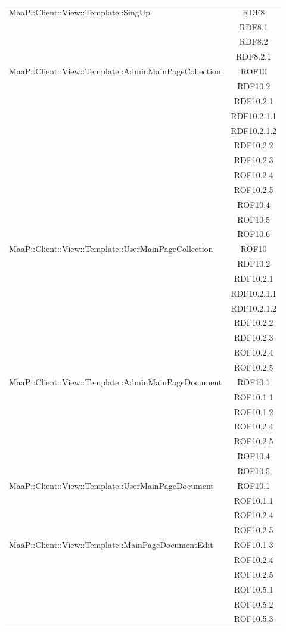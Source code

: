 \begin{center}
\begin{longtable}{|p{0.8\linewidth}|c|}
\midrule
MaaP::Client::View::Template::SingUp
& RDF8\\
& RDF8.1\\
& RDF8.2\\
& RDF8.2.1\\

\midrule
MaaP::Client::View::Template::AdminMainPageCollection
& ROF10\\
& RDF10.2\\
& RDF10.2.1\\
& RDF10.2.1.1\\
& RDF10.2.1.2\\
& RDF10.2.2\\
& RDF10.2.3\\
& ROF10.2.4\\
& ROF10.2.5\\
& ROF10.4\\
& ROF10.5\\
& ROF10.6\\


\midrule
MaaP::Client::View::Template::UserMainPageCollection
& ROF10\\
& RDF10.2\\
& RDF10.2.1\\
& RDF10.2.1.1\\
& RDF10.2.1.2\\
& RDF10.2.2\\
& RDF10.2.3\\
& ROF10.2.4\\
& ROF10.2.5\\

\midrule
MaaP::Client::View::Template::AdminMainPageDocument
& ROF10.1\\
& ROF10.1.1\\
& ROF10.1.2\\
& ROF10.2.4\\
& ROF10.2.5\\
& ROF10.4\\
& ROF10.5\\


\midrule
MaaP::Client::View::Template::UserMainPageDocument
& ROF10.1\\
& ROF10.1.1\\
& ROF10.2.4\\
& ROF10.2.5\\


\midrule
MaaP::Client::View::Template::MainPageDocumentEdit
& ROF10.1.3\\
& ROF10.2.4\\
& ROF10.2.5\\
& ROF10.5.1\\
& ROF10.5.2\\
& ROF10.5.3\\



\end{longtable}
\end{center}

